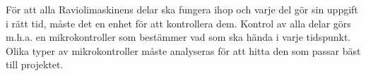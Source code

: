 För att alla Raviolimaskinens delar ska fungera ihop och varje del gör sin uppgift i rätt tid, måste det en enhet för att kontrollera dem. Kontrol av alla delar görs m.h.a. en mikrokontroller som bestämmer vad som ska hända i varje tidspunkt. Olika typer av mikrokontroller måste analyseras för att hitta den som passar bäst till projektet.




